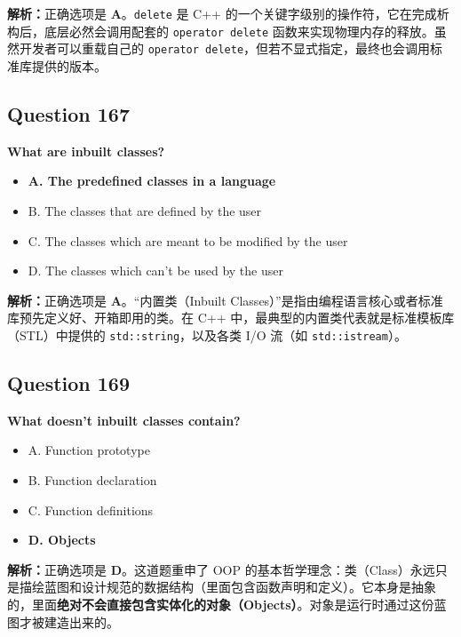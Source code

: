 \documentclass[11pt, a4paper]{article}
\begin{document}
\textbf{解析：}正确选项是 \textbf{A}。\texttt{delete} 是 C++ 的一个关键字级别的操作符，它在完成析构后，底层必然会调用配套的 \texttt{operator delete} 函数来实现物理内存的释放。虽然开发者可以重载自己的 \texttt{operator delete}，但若不显式指定，最终也会调用标准库提供的版本。


\subsection*{Question 167}
\textbf{What are inbuilt classes?}
\begin{itemize}
    \item \textbf{A. The predefined classes in a language}
    \item B. The classes that are defined by the user
    \item C. The classes which are meant to be modified by the user
    \item D. The classes which can’t be used by the user
\end{itemize}

\textbf{解析：}正确选项是 \textbf{A}。“内置类（Inbuilt Classes）”是指由编程语言核心或者标准库预先定义好、开箱即用的类。在 C++ 中，最典型的内置类代表就是标准模板库（STL）中提供的 \texttt{std::string}，以及各类 I/O 流（如 \texttt{std::istream}）。


\subsection*{Question 169}
\textbf{What doesn’t inbuilt classes contain?}
\begin{itemize}
    \item A. Function prototype
    \item B. Function declaration
    \item C. Function definitions
    \item \textbf{D. Objects}
\end{itemize}

\textbf{解析：}正确选项是 \textbf{D}。这道题重申了 OOP 的基本哲学理念：类（Class）永远只是描绘蓝图和设计规范的数据结构（里面包含函数声明和定义）。它本身是抽象的，里面\textbf{绝对不会直接包含实体化的对象（Objects）}。对象是运行时通过这份蓝图才被建造出来的。

\end{document}

